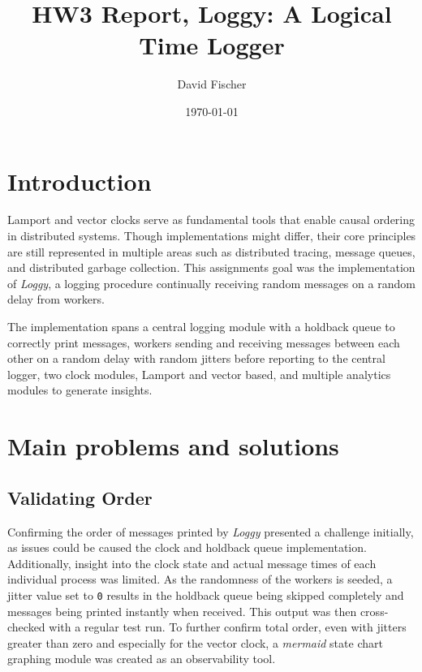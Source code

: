 \documentclass[a4paper, 11pt]{article}
\title{HW3 Report, Loggy: A Logical Time Logger}
\author{David Fischer}
\date{\today{}}
\begin{document}
\maketitle

\section{Introduction}
Lamport and vector clocks serve as fundamental tools that enable causal ordering in distributed systems. Though implementations might differ, their core principles are still represented in multiple areas such as distributed tracing, message queues, and distributed garbage collection.
This assignments goal was the implementation of \textit{Loggy}, a logging procedure continually receiving random messages on a random delay from workers.

The implementation spans a central logging module with a holdback queue to correctly print messages, workers sending and receiving messages between each other on a random delay with random jitters before reporting to the central logger, two clock modules, Lamport and vector based, and multiple analytics modules to generate insights.

\section{Main problems and solutions}

\subsection{Validating Order}

Confirming the order of messages printed by \textit{Loggy} presented a challenge initially, as issues could be caused the clock and holdback queue implementation. Additionally, insight into the clock state and actual message times of each individual process was limited. 
As the randomness of the workers is seeded, a jitter value set to \texttt{0} results in the holdback queue being skipped completely and messages being printed instantly when received. This output was then cross-checked with a regular test run.
To further confirm total order, even with jitters greater than zero and especially for the vector clock, a \textit{mermaid} state chart graphing module was created as an observability tool. 
\end{document}
